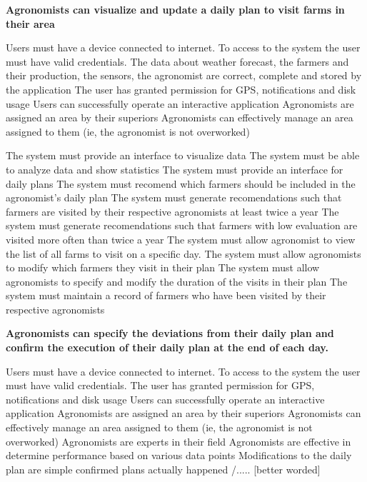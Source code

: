 \begin{itemize}
 \textbf{Agronomists can visualize and update a daily plan to visit farms in their area}
\begin{itemize}
  Users must have a device connected to internet.
 To access to the system the user must have valid credentials.
 The data about weather forecast, the farmers and their production, the sensors, the agronomist are correct, complete and stored by the application
 The user has granted permission for GPS, notifications and disk usage
 Users can successfully operate an interactive application
 Agronomists are assigned an area by their superiors
 Agronomists can effectively manage an area assigned to them (ie, the agronomist is not overworked)


 The system must provide an interface to visualize data
 The system must be able to analyze data and show statistics
  The system must provide an interface for daily plans
  The system must recomend which farmers should be included in the agronomist's daily plan
  The system must generate recomendations such that farmers are visited by their respective agronomists at least twice a year
  The system must generate recomendations such that farmers with low evaluation are visited more often than twice a year
  The system must allow agronomist to view the list of all farms to visit on a specific day.
  The system must allow agronomists to modify which farmers they visit in their plan
  The system must allow agronomists to specify and modify the duration of the visits in their plan
  The system must maintain a record of farmers who have been visited by their respective agronomists

\end{itemize}

 \textbf{Agronomists can specify the deviations from their daily plan and confirm the execution of their daily plan at the end of each day. }
\begin{itemize}
  Users must have a device connected to internet.
 To access to the system the user must have valid credentials.
 The user has granted permission for GPS, notifications and disk usage
 Users can successfully operate an interactive application
 Agronomists are assigned an area by their superiors
 Agronomists can effectively manage an area assigned to them (ie, the agronomist is not overworked)
 Agronomists are experts in their field
 Agronomists are effective in determine performance based on various data points
 Modifications to the daily plan are simple
 confirmed plans actually happened /..... [better worded]



\end{itemize}
\end{itemize}
